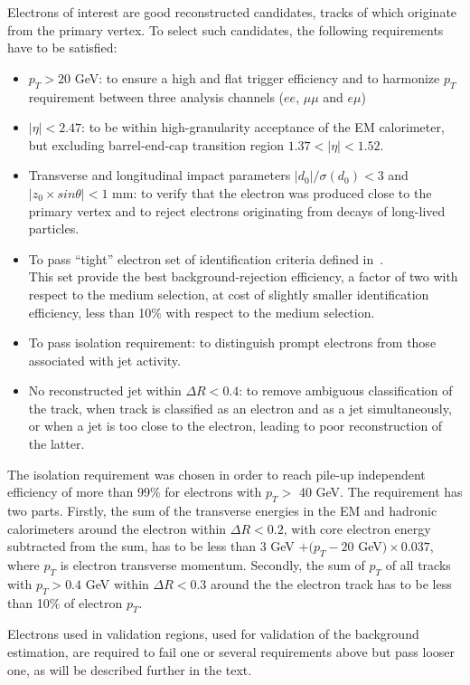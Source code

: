 Electrons of interest are good reconstructed candidates, tracks of which originate from the primary vertex. To select such candidates, 
the following requirements have to be satisfied:
\begin{itemize}
 \item $p_T > 20$ GeV: to ensure a high and flat trigger efficiency and to harmonize $p_T$ requirement between three analysis channels ($ee$, $\mu\mu$ and $e\mu$) 
 \item $|\eta|<2.47$: to be within high-granularity acceptance of the EM calorimeter, but excluding barrel-end-cap transition region $1.37<|\eta|<1.52$.
 \item Transverse and longitudinal impact parameters $|d_0|/\sigma(d_0) < 3$ and $|z_0 \times sin \theta| < 1$ mm: 
 to verify that the electron was produced close to the primary vertex and to reject electrons originating from decays of long-lived particles.
 \item To pass ``tight'' electron set of identification criteria defined in~\cite{electron_tight}. \\ 
 This set provide the best background-rejection efficiency, a factor of two with respect to the medium selection, 
 at cost of slightly smaller identification efficiency, less than 10$\%$ with respect to the medium selection.
 \item To pass isolation requirement: to distinguish prompt electrons from those associated with jet activity.
 \item No reconstructed jet within $\Delta R < 0.4$: to remove ambiguous classification of the track, 
 when track is classified as an electron and as a jet simultaneously,
 or when a jet is too close to the electron, leading to poor reconstruction of the latter. 
\end{itemize}

The isolation requirement was chosen in order to reach pile-up independent efficiency of more than 99$\%$ for electrons 
with $p_T >$ 40 GeV. The requirement has two parts.
Firstly, the sum of the transverse energies in the EM and hadronic calorimeters around the electron within 
$\Delta R < 0.2$, with core electron energy subtracted from the sum, has to be less than 
3 GeV $+ (p_T - 20$ GeV$) \times 0.037$, where $p_T$ is electron transverse momentum.
Secondly, the sum of $p_T$ of all tracks with $p_T > 0.4$ GeV within $\Delta R < 0.3$ around the the electron track has
to be less than 10$\%$ of electron $p_T$.

Electrons used in validation regions, used for validation of the background estimation, 
are required to fail one or several requirements above but pass looser one, as will be described further in the text.


